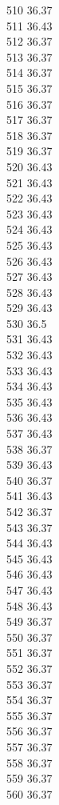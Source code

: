 510	36.37\\
511	36.43\\
512	36.37\\
513	36.37\\
514	36.37\\
515	36.37\\
516	36.37\\
517	36.37\\
518	36.37\\
519	36.37\\
520	36.43\\
521	36.43\\
522	36.43\\
523	36.43\\
524	36.43\\
525	36.43\\
526	36.43\\
527	36.43\\
528	36.43\\
529	36.43\\
530	36.5\\
531	36.43\\
532	36.43\\
533	36.43\\
534	36.43\\
535	36.43\\
536	36.43\\
537	36.43\\
538	36.37\\
539	36.43\\
540	36.37\\
541	36.43\\
542	36.37\\
543	36.37\\
544	36.43\\
545	36.43\\
546	36.43\\
547	36.43\\
548	36.43\\
549	36.37\\
550	36.37\\
551	36.37\\
552	36.37\\
553	36.37\\
554	36.37\\
555	36.37\\
556	36.37\\
557	36.37\\
558	36.37\\
559	36.37\\
560	36.37\\

